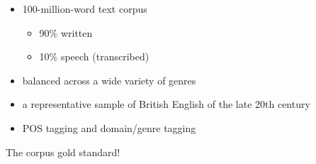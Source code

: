 \documentclass[a4paper,landscape,headrule,footrule,xetex]{foils}
\begin{document}

\begin{itemize}
\item 100-million-word text corpus
  \begin{itemize}
  \item 90\% written
  \item 10\% speech (transcribed)
  \end{itemize}
\item balanced across a wide variety of genres
\item  a representative sample of  British English of the late 20th century
\item POS tagging and domain/genre tagging
\end{itemize}

\begin{center}
  The corpus gold standard!
\end{center}
\end{document}
